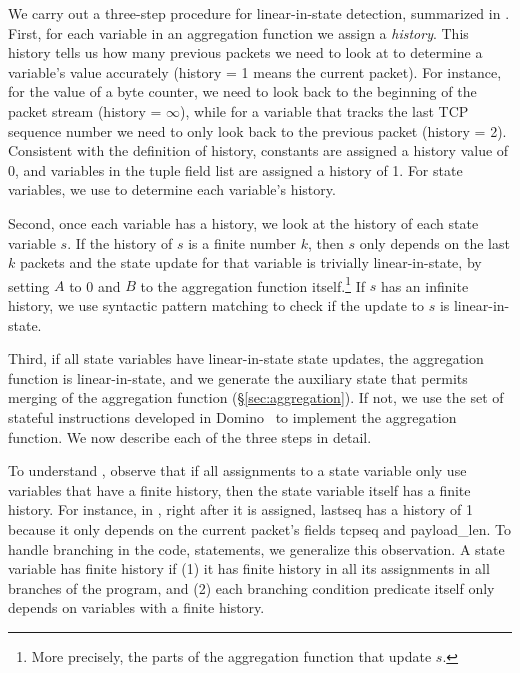 We carry out a three-step procedure for linear-in-state
detection, summarized in .  First, for each variable in an
aggregation function we assign a {\em history}.  This history tells us how many
previous packets we need to look at to determine a variable's value accurately
(history = 1 means the current packet). For instance, for the value of a byte
counter, we need to look back to the beginning of the packet stream (history =
$\infty$), while for a variable that tracks the last TCP sequence number
we need to only look back to the previous packet (history = 2). Consistent with
the definition of history, constants are assigned a history value of 0, and
variables in the tuple field list are assigned a history of 1. For state
variables, we use  to determine each variable's history.

Second, once each variable has a history, we look at the history of each state
variable $s$. If the history of $s$ is a finite number $k$, then $s$ only
depends on the last $k$ packets and the state update for that variable is
trivially linear-in-state, by setting $A$ to 0 and $B$ to the aggregation
function itself.\footnote{More precisely, the parts of the aggregation function
that update $s$.} If $s$ has an infinite history, we use syntactic pattern
matching to check if the update to $s$ is linear-in-state.

Third, if all state variables have linear-in-state state updates, the
aggregation function is linear-in-state, and we generate the auxiliary state
that permits merging of the aggregation function (\S\ref{sec:aggregation}). If
not, we use the set of stateful instructions developed in Domino~\cite{domino_sigcomm}
to implement the aggregation function. We now describe each of the three steps
in detail.

 To understand , observe that if all
assignments to a state variable only use variables that have a finite history,
then the state variable itself has a finite history. For instance, in
, right after it is assigned, {\ct lastseq} has a history of 1 because it only
depends on the current packet's fields {\ct tcpseq} and {\ct payload\_len}. To
handle branching in the code,  statements, we
generalize this observation. A state variable has finite history if  (1) it 
has finite history in all its assignments in all branches of the program,
and (2) each branching condition {\ct predicate} itself only depends on
variables with a finite history.

